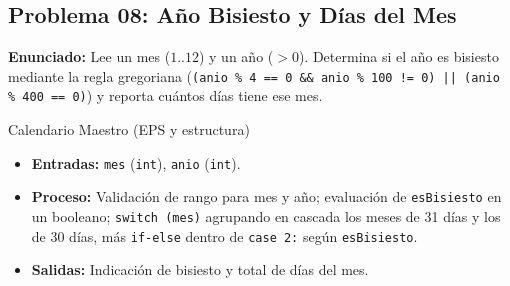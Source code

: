 \documentclass[11pt,letterpaper]{article}
\begin{document}
\subsection{Problema 08: Año Bisiesto y Días del Mes}

\textbf{Enunciado:} Lee un mes ($1..12$) y un año ($> 0$). Determina si el año es bisiesto mediante la regla gregoriana (\texttt{(anio \% 4 == 0 \&\& anio \% 100 != 0) || (anio \% 400 == 0)}) y reporta cuántos días tiene ese mes.

\begin{analisis}{Calendario Maestro (EPS y estructura)}
\begin{itemize}
  \item \textbf{Entradas:} \texttt{mes} (\texttt{int}), \texttt{anio} (\texttt{int}).
  \item \textbf{Proceso:} Validación de rango para mes y año; evaluación de \texttt{esBisiesto} en un booleano; \texttt{switch (mes)} agrupando en cascada los meses de 31 días y los de 30 días, más \texttt{if-else} dentro de \texttt{case 2:} según \texttt{esBisiesto}.
  \item \textbf{Salidas:} Indicación de bisiesto y total de días del mes.
\end{itemize}
\end{analisis}





\end{document}
